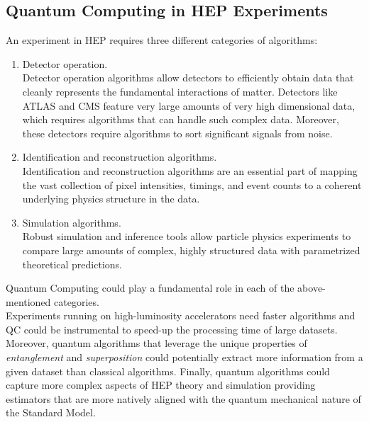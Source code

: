 \subsection{Quantum Computing in HEP Experiments}

An experiment in HEP requires three different categories of algorithms:

\begin{enumerate}
    \item Detector operation.\\
    Detector operation algorithms allow detectors to efficiently obtain data that cleanly represents the 
    fundamental interactions of matter. Detectors like ATLAS and CMS feature very large amounts of very high 
    dimensional data, which requires algorithms that can handle such complex data.
    Moreover, these detectors require algorithms to sort significant signals from noise.
    \item Identification and reconstruction algorithms.\\
    Identification and reconstruction algorithms are an essential part of mapping the vast collection of 
    pixel intensities, timings, and event counts to a coherent underlying physics structure in the data.
    \item Simulation algorithms.\\
    Robust simulation and inference tools allow particle physics experiments to compare 
    large amounts of complex, highly structured data with parametrized theoretical predictions.
\end{enumerate}

Quantum Computing could play a fundamental role in each of the above-mentioned categories.\\
Experiments running on high-luminosity accelerators need faster algorithms and QC 
could be instrumental to speed-up the processing time of large datasets.
Moreover, quantum algorithms that leverage the unique properties of \textit{entanglement} and 
\textit{superposition} could potentially extract more information 
from a given dataset than classical algorithms.
Finally, quantum algorithms could capture more complex aspects of HEP theory and simulation providing 
estimators that are more natively aligned with the quantum mechanical nature of the Standard Model.

